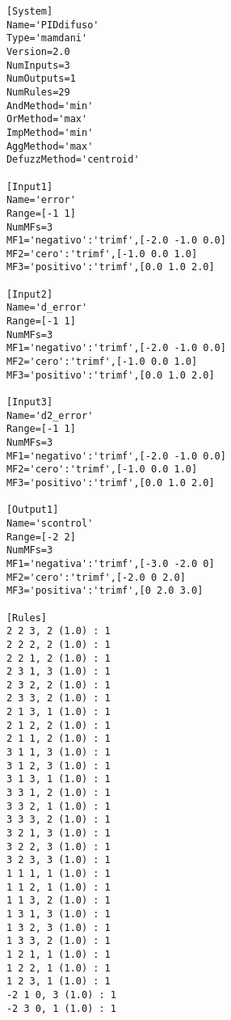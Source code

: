     \begin{longlisting}				
        \begin{verbatim}
            [System]
            Name='PIDdifuso'
            Type='mamdani'
            Version=2.0
            NumInputs=3
            NumOutputs=1
            NumRules=29
            AndMethod='min'
            OrMethod='max'
            ImpMethod='min'
            AggMethod='max'
            DefuzzMethod='centroid'

            [Input1]
            Name='error'
            Range=[-1 1]
            NumMFs=3
            MF1='negativo':'trimf',[-2.0 -1.0 0.0]
            MF2='cero':'trimf',[-1.0 0.0 1.0]
            MF3='positivo':'trimf',[0.0 1.0 2.0]

            [Input2]
            Name='d_error'
            Range=[-1 1]
            NumMFs=3
            MF1='negativo':'trimf',[-2.0 -1.0 0.0]
            MF2='cero':'trimf',[-1.0 0.0 1.0]
            MF3='positivo':'trimf',[0.0 1.0 2.0]

            [Input3]
            Name='d2_error'
            Range=[-1 1]
            NumMFs=3
            MF1='negativo':'trimf',[-2.0 -1.0 0.0]
            MF2='cero':'trimf',[-1.0 0.0 1.0]
            MF3='positivo':'trimf',[0.0 1.0 2.0]

            [Output1]
            Name='scontrol'
            Range=[-2 2]
            NumMFs=3
            MF1='negativa':'trimf',[-3.0 -2.0 0]
            MF2='cero':'trimf',[-2.0 0 2.0]
            MF3='positiva':'trimf',[0 2.0 3.0]

            [Rules]
            2 2 3, 2 (1.0) : 1
            2 2 2, 2 (1.0) : 1
            2 2 1, 2 (1.0) : 1
            2 3 1, 3 (1.0) : 1
            2 3 2, 2 (1.0) : 1
            2 3 3, 2 (1.0) : 1
            2 1 3, 1 (1.0) : 1
            2 1 2, 2 (1.0) : 1
            2 1 1, 2 (1.0) : 1
            3 1 1, 3 (1.0) : 1
            3 1 2, 3 (1.0) : 1
            3 1 3, 1 (1.0) : 1
            3 3 1, 2 (1.0) : 1
            3 3 2, 1 (1.0) : 1
            3 3 3, 2 (1.0) : 1
            3 2 1, 3 (1.0) : 1
            3 2 2, 3 (1.0) : 1
            3 2 3, 3 (1.0) : 1
            1 1 1, 1 (1.0) : 1
            1 1 2, 1 (1.0) : 1
            1 1 3, 2 (1.0) : 1
            1 3 1, 3 (1.0) : 1
            1 3 2, 3 (1.0) : 1
            1 3 3, 2 (1.0) : 1
            1 2 1, 1 (1.0) : 1
            1 2 2, 1 (1.0) : 1
            1 2 3, 1 (1.0) : 1
            -2 1 0, 3 (1.0) : 1
            -2 3 0, 1 (1.0) : 1
        \end{verbatim}
    \end{longlisting}

